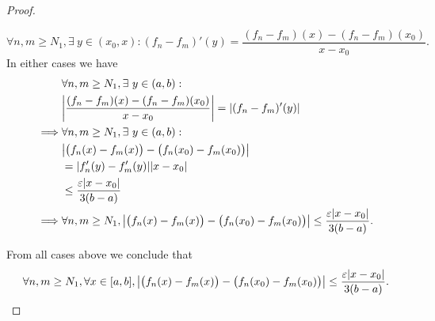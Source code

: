 \begin{proof}
\begin{itemize}
              \[
                  \forall n, m \geq N_1, \exists\ y \in (x_0, x) : (f_n - f_m)'(y) = \frac{(f_n - f_m)(x) - (f_n - f_m)(x_0)}{x - x_0}.
              \]
              In either cases we have
              \begin{align*}
                           & \forall n, m \geq N_1, \exists\ y \in (a, b) :                                                                                            \\
                           & \abs*{\frac{(f_n - f_m)(x) - (f_n - f_m)(x_0)}{x - x_0}} = \abs*{(f_n - f_m)'(y)}                                                         \\
                  \implies & \forall n, m \geq N_1, \exists\ y \in (a, b) :                                                                                            \\
                           & \abs*{\big(f_n(x) - f_m(x)\big) - \big(f_n(x_0) - f_m(x_0)\big)}                                                                          \\
                           & = \abs*{f_n'(y) - f_m'(y)} \abs*{x - x_0}                                                                                                 \\
                           & \leq \frac{\varepsilon \abs*{x - x_0}}{3(b - a)}                                                                                          \\
                  \implies & \forall n, m \geq N_1, \abs*{\big(f_n(x) - f_m(x)\big) - \big(f_n(x_0) - f_m(x_0)\big)} \leq \frac{\varepsilon \abs*{x - x_0}}{3(b - a)}.
              \end{align*}
    \end{itemize}
    From all cases above we conclude that
    \[
        \forall n, m \geq N_1, \forall x \in [a, b], \abs*{\big(f_n(x) - f_m(x)\big) - \big(f_n(x_0) - f_m(x_0)\big)} \leq \frac{\varepsilon \abs*{x - x_0}}{3(b - a)}.
    \]


\end{proof}

